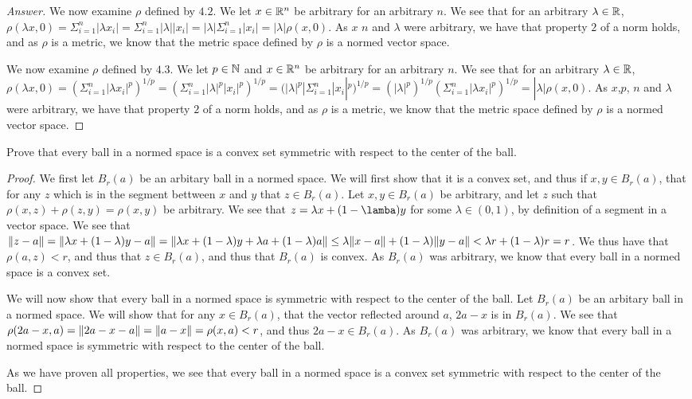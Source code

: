 \begin{proof}[Answer]
  We now examine $\rho$ defined by $4.2$. 
  We let $x\in \mathbb{R}^n$ be arbitrary for an arbitrary $n$. We see that 
  for an arbitrary $\lambda \in \mathbb{R}$, $\rho(\lambda x,0)=
  \Sigma_{i=1}^n|\lambda x_i| =
  \Sigma_{i=1}^n |\lambda| | x_i|=
  |\lambda| \Sigma_{i=1}^n | x_i|=
  |\lambda| \rho(x,0)$. As $x$  $n$ and $\lambda$ were arbitrary,
  we have that property $2$ of a norm holds, and as $\rho$ is a
  metric, we know that the metric space defined by $\rho$ is a normed
  vector space. 

  We now examine $\rho$ defined by $4.3$. 
  We let $p\in \mathbb{N}$ and $x\in \mathbb{R}^n$ be arbitrary
  for an arbitrary $n$. We see that 
  for an arbitrary $\lambda \in \mathbb{R}$, $\rho(\lambda x,0)=
  (\Sigma_{i=1}^n |\lambda x_i|^p)^{1/p} =
  (\Sigma_{i=1}^n |\lambda|^p |x_i|^p)^{1/p} =
 ( |\lambda|^p|\Sigma_{i=1}^n |x_i|^p)^{1/p} =
 ( |\lambda|^p)^{1/p}(\Sigma_{i=1}^n |\lambda x_i|^p)^{1/p} =
  |\lambda| \rho(x,0)$. As $x$,$p$, $n$ and $\lambda$ were arbitrary,
  we have that property $2$ of a norm holds, and as $\rho$ is a
  metric, we know that the metric space defined by $\rho$ is a normed
  vector space. 
\end{proof}

\begin{minorEx}%
    Prove that every ball in a normed space is a convex set symmetric with
    respect to the center of the ball.
\end{minorEx}

\begin{proof}
  We first let $B_r(a)$ be an arbitary ball in a normed space. We will
  first show that it is a convex set, and thus if $x,y\in B_r(a)$,
  that for any $z$ which is in the segment bettween $x$ and $y$
  that $z\in B_r(a)$. Let $x,y\in B_r(a)$ be arbitrary, and let $z$
  such that $\rho(x,z)+\rho(z,y)=\rho(x,y)$ be arbitrary. We see that
  $z= \lambda x + (1-\lamba)y$ for some $\lambda \in (0,1)$, by
  definition of a segment in a vector space. We see that 
  $\Vert z-a\Vert = \Vert\lambda x + (1-\lambda)y - a\Vert = \Vert\lambda
    x+ (1-\lambda)y + \lambda a + (1-\lambda) a\Vert \leq
  \lambda\Vert x-a\Vert + (1-\lambda)\Vert y-a\Vert< \lambda r + (1-\lambda)r
  = r$. We thus have that $\rho(a,z)< r$, and thus that $z\in B_r(a)$,
  and thus that $B_r(a)$ is convex. As $B_r(a)$ was arbitrary, we know
  that every ball in a normed space is a convex set.

  We will now show that every ball in a normed space is 
  symmetric with respect to the center of the ball.  Let $B_r(a)$ be
  an arbitary ball in a normed space. We will show that for any $x \in
  B_r(a)$, that the vector reflected around $a$, $2a -x$ is in
  $B_r(a)$. 
  We see that $\rho(2a-x,a)= \Vert2a-x -a\Vert = \Vert a-x\Vert=\rho(x,a)<r$,
  and thus $2a -x\in B_r(a)$. As $B_r(a)$ was arbitrary, we know that 
   every ball in a normed space is symmetric with respect to the
   center of the ball. 

   As we have proven all properties, we see that every ball in a
   normed space is a convex set symmetric with respect to the center
   of the ball.
\end{proof}

